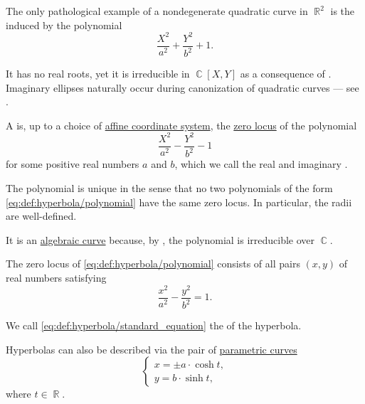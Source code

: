 \begin{example}\label{ex:imaginary_ellipse}
  The only pathological example of a nondegenerate quadratic curve in \( \BbbR^2 \) is the  induced by the polynomial
  \begin{equation}\label{eq:ex:imaginary_ellipse}
    \frac {X^2} {a^2} + \frac {Y^2} {b^2} + 1.
  \end{equation}

  It has no real roots, yet it is irreducible in \( \BbbC[X, Y] \) as a consequence of . Imaginary ellipses naturally occur during canonization of quadratic curves --- see .
\end{example}

\begin{definition}\label{def:hyperbola}
  A  is, up to a choice of \hyperref[def:affine_coordinate_system]{affine coordinate system}, the \hyperref[def:zero_locus]{zero locus} of the polynomial
  \begin{equation}\label{eq:def:hyperbola/polynomial}
    \frac {X^2} {a^2} - \frac {Y^2} {b^2} - 1
  \end{equation}
  for some positive real numbers \( a \) and \( b \), which we call the real and imaginary .

  The polynomial is unique in the sense that no two polynomials of the form \eqref{eq:def:hyperbola/polynomial} have the same zero locus. In particular, the radii are well-defined.

  It is an \hyperref[def:affine_algebraic_set/curve]{algebraic curve} because, by , the polynomial is irreducible over \( \BbbC \).

  \begin{thmenum}
     The zero locus of \eqref{eq:def:hyperbola/polynomial} consists of all pairs \( (x, y) \) of real numbers satisfying
    \begin{equation}\label{eq:def:hyperbola/standard_equation}
      \frac {x^2} {a^2} - \frac {y^2} {b^2} = 1.
    \end{equation}

    We call \eqref{eq:def:hyperbola/standard_equation} the  of the hyperbola.

     Hyperbolas can also be described via the pair of \hyperref[def:parametric_curve]{parametric curves}
    \begin{equation}\label{eq:def:hyperbola/parametric_equation}
      \begin{cases}
        x = \pm a \cdot \cosh t, \\
        y = b \cdot \sinh t,
      \end{cases}
    \end{equation}
    where \( t \in \BbbR \).


\end{thmenum}
\end{definition}
